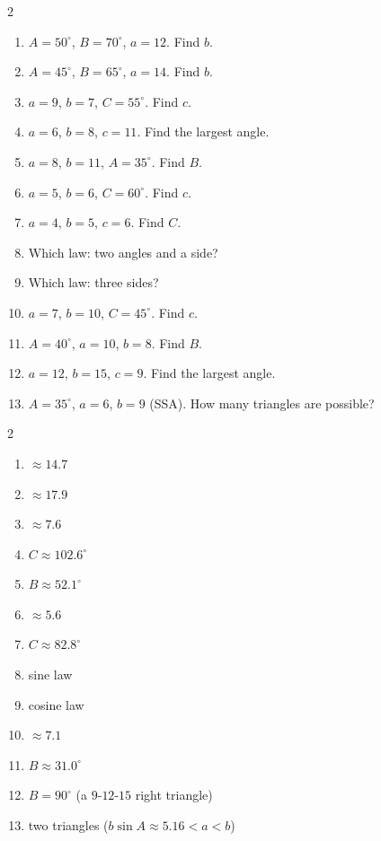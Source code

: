 \documentclass[11pt]{article}
\begin{document}
\begin{recapbox}
\begin{multicols}{2}
\small
\begin{enumerate}[leftmargin=*,itemsep=3pt]
  \item $A=50^\circ$, $B=70^\circ$, $a=12$. Find $b$.
  \item $A=45^\circ$, $B=65^\circ$, $a=14$. Find $b$.
  \item $a=9$, $b=7$, $C=55^\circ$. Find $c$.
  \item $a=6$, $b=8$, $c=11$. Find the largest angle.
  \item $a=8$, $b=11$, $A=35^\circ$. Find $B$.
  \item $a=5$, $b=6$, $C=60^\circ$. Find $c$.
  \item $a=4$, $b=5$, $c=6$. Find $C$.
  \item Which law: two angles and a side?
  \item Which law: three sides?
  \item $a=7$, $b=10$, $C=45^\circ$. Find $c$.
  \item $A=40^\circ$, $a=10$, $b=8$. Find $B$.
  \item $a=12$, $b=15$, $c=9$. Find the largest angle.
  \item $A=35^\circ$, $a=6$, $b=9$ (SSA). How many triangles are possible?
\end{enumerate}
\end{multicols}
\end{recapbox}

\begin{keybox}
\begin{multicols}{2}
\small
\begin{enumerate}[leftmargin=*,itemsep=3pt]
  \item $\approx14.7$
  \item $\approx17.9$
  \item $\approx7.6$
  \item $C\approx102.6^\circ$
  \item $B\approx52.1^\circ$
  \item $\approx5.6$
  \item $C\approx82.8^\circ$
  \item sine law
  \item cosine law
  \item $\approx7.1$
  \item $B\approx31.0^\circ$
  \item $B=90^\circ$ (a $9$-$12$-$15$ right triangle)
  \item two triangles ($b\sin A\approx5.16<a<b$)
\end{enumerate}
\end{multicols}
\end{keybox}
\end{document}
